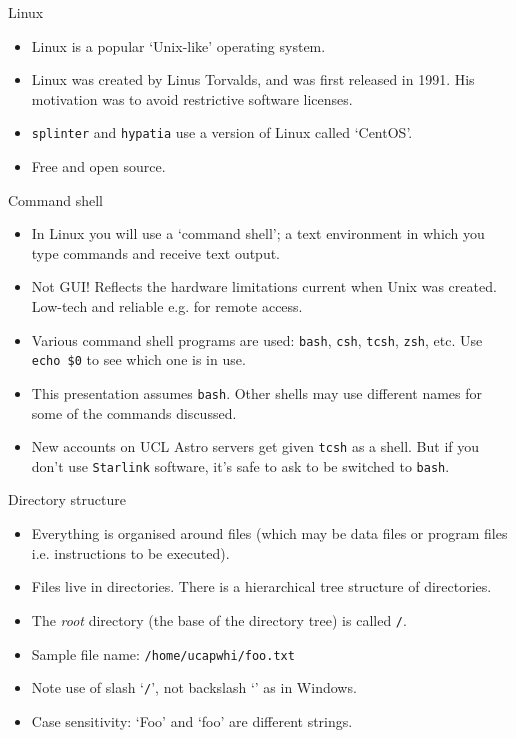 \documentclass[dvipsnames]{beamer}
\newcommand{\command}[1]{\colorbox{light-gray}{\texttt{#1}}}
\newcommand{\filename}[1]{\colorbox{light-green}{\texttt{#1}}}
\newcommand{\server}[1]{\textcolor{BrickRed}{\texttt{#1}}}
\begin{document}
\begin{frame}{Linux}
  \begin{itemize}
    \item Linux is a popular `Unix-like' operating system.
    \item Linux was created by  Linus Torvalds, and was first released in 1991. His motivation was to avoid restrictive software licenses.
    \item \server{splinter} and \server{hypatia} use a version of Linux called `CentOS'.
    \item Free and open source.
   \end{itemize}
\end{frame}


\begin{frame}{Command shell}
  \begin{itemize}
    \item In Linux you will use a `command shell'; a text environment in which you type commands and receive text output.
    \item Not GUI! Reflects the hardware limitations current when Unix was created. Low-tech and reliable e.g. for remote access.
    \item Various command shell programs are used: \command{bash}, \command{csh}, \command{tcsh}, \command{zsh}, etc. Use \command{echo \$0} to see which one is in use.
    \item This presentation assumes \command{bash}. Other shells may use different names for some of the commands discussed.
    \item New accounts on UCL Astro servers get given \command{tcsh} as a shell. But if you don't use \texttt{Starlink} software, it's safe to ask to be switched to \command{bash}.
   \end{itemize}
\end{frame}


\begin{frame}{Directory structure}
  \begin{itemize}
    \item Everything is organised around files (which may be data files or program files i.e. instructions to be executed).
    \item Files live in directories. There is a hierarchical tree structure of directories.
    \item The \textit{root} directory (the base of the directory tree) is called \filename{/}.
    \item Sample file name: \filename{/home/ucapwhi/foo.txt}
    \item Note use of slash `\texttt{/}', not backslash `\texttt{}' as in Windows.
    \item Case sensitivity: `Foo' and `foo' are different strings.
  \end{itemize}
\end{frame}
\end{document}
